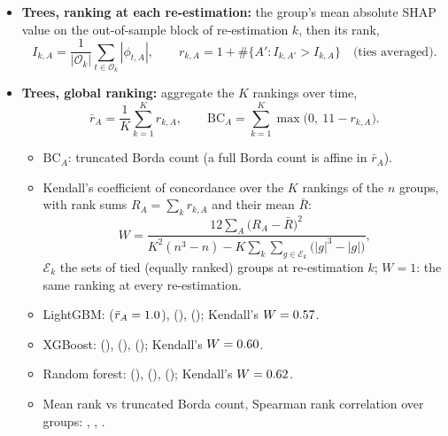\begin{itemize}
  (mean rank by $\lVert\hat{\bm\beta}_{k,A}\rVert_1$); Kendall's
  $W = \rhfiRidgeW$.
\item \textbf{Trees, ranking at each re-estimation:} the group's mean absolute SHAP value on the out-of-sample block
  of re-estimation $k$, then its rank,
  \[
    I_{k,A} = \frac{1}{|\mathcal O_k|} \sum_{t \in \mathcal O_k} |\phi_{t,A}|, \qquad
    r_{k,A} = 1 + \#\{A' : I_{k,A'} > I_{k,A}\} \quad \text{(ties averaged)}.
  \]
\item \textbf{Trees, global ranking:} aggregate the $K$ rankings over time,
  \[
    \bar r_A = \frac{1}{K} \sum_{k=1}^{K} r_{k,A}, \qquad
    \mathrm{BC}_A = \sum_{k=1}^{K} \max\bigl(0,\ 11 - r_{k,A}\bigr).
  \]
  \begin{itemize}
  \item $\mathrm{BC}_A$: truncated Borda count (a full Borda count is affine in $\bar r_A$).
  \item Kendall's coefficient of concordance \citep{KendallBabingtonSmith1939} over the $K$ rankings of the $n$
    groups, with rank sums
    $R_A = \sum_k r_{k,A}$ and their mean $\bar R$:
    \[
      W = \frac{12 \sum_{A} \bigl(R_A - \bar R\bigr)^2}
        {K^2 (n^3 - n) - K \sum_{k} \sum_{g \in \mathcal E_k} \bigl(|g|^3 - |g|\bigr)},
    \]
    $\mathcal E_k$ the sets of tied (equally ranked) groups at re-estimation $k$; $W = 1$: the same ranking at every
    re-estimation.
  \item LightGBM: \rhfiLgbmTopOne{} ($\bar r_A = 1.0$), \rhfiLgbmTopTwo{} (\rhfiLgbmTopTwoRank),
    \rhfiLgbmTopThree{} (\rhfiLgbmTopThreeRank); Kendall's $W = 0.57$.
  \item XGBoost: \rhfiXgbTopOne{} (\rhfiXgbTopOneRank), \rhfiXgbTopTwo{} (\rhfiXgbTopTwoRank), \rhfiXgbTopThree{}
    (\rhfiXgbTopThreeRank); Kendall's $W = 0.60$.
  \item Random forest: \rhfiRfTopOne{} (\rhfiRfTopOneRank), \rhfiRfTopTwo{} (\rhfiRfTopTwoRank), \rhfiRfTopThree{}
    (\rhfiRfTopThreeRank); Kendall's $W = 0.62$.
  \item Mean rank vs truncated Borda count, Spearman rank correlation over groups: \rhfiLgbmSpBorda, \rhfiXgbSpBorda,
    \rhfiRfSpBorda.

\end{itemize}
\end{itemize}

